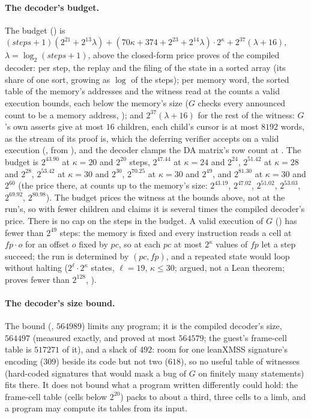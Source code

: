 \documentclass[11pt]{article}
\begin{document}
\paragraph{The decoder's budget.} The budget () is
$(\mathit{steps} + 1)(2^{21} + 2^{13}\lambda) + (70\kappa + 374 + 2^{23} + 2^{14}\lambda)\cdot 2^\kappa + 2^{37}(\lambda + 16)$,
$\lambda = \log_2(\mathit{steps} + 1)$, above the closed-form price  proves of the
compiled decoder: per step, the replay and the filing of the state in a sorted array (its share of
one sort, growing as $\log$ of the steps); per memory word, the sorted table of the memory's
addresses and the witness read at the counts a valid execution bounds, each below the memory's
size ($G$ checks every announced count to be a memory address, ); and
$2^{37}(\lambda + 16)$ for the rest of the witness: $G$'s own asserts give at most $16$ children,
each child's cursor is at most $8192$ words, as the stream of its proof is, which the deferring
verifier accepts on a valid execution (, from
), and the decoder clamps the DA matrix's row count at . The
budget is $2^{43.90}$ at $\kappa = 20$ and $2^{20}$ steps, $2^{47.44}$ at $\kappa = 24$ and
$2^{24}$, $2^{51.42}$ at $\kappa = 28$ and $2^{28}$, $2^{53.42}$ at $\kappa = 30$ and $2^{30}$,
$2^{70.25}$ at $\kappa = 30$ and $2^{49}$, and $2^{81.30}$ at $\kappa = 30$ and $2^{60}$ (the price
there, at counts up to the memory's size: $2^{43.19}$, $2^{47.02}$, $2^{51.02}$, $2^{53.03}$,
$2^{69.92}$, $2^{80.98}$). The budget prices the witness at the bounds above, not at the run's, so
with fewer children and claims it is several times the compiled decoder's price. There is no cap on the steps in the budget. A valid execution of $G$ ()
has fewer than $2^{49}$ steps: the memory is fixed and every instruction reads a cell at
$\mathit{fp}\cdot o$ for an offset $o$ fixed by $\mathit{pc}$, so at each $\mathit{pc}$ at most
$2^\kappa$ values of $\mathit{fp}$ let a step succeed; the run is determined by
$(\mathit{pc}, \mathit{fp})$, and a repeated state would loop without halting
($2^\ell\cdot 2^\kappa$ states, $\ell = 19$, $\kappa \le 30$; argued, not a Lean theorem;
 proves fewer than $2^{128}$, ).

\paragraph{The decoder's size bound.} The bound (, $564989$) limits any program; it is the compiled decoder's size, $564497$ (measured exactly, and proved at most $564579$; the guest's frame-cell table is $517271$ of it), and a slack of $492$: room for one leanXMSS signature's encoding ($309$) beside its code but not two ($618$), so no useful table of witnesses (hard-coded signatures that would mask a bug of $G$ on finitely many statements) fits there. It does not bound what a program written differently could hold: the frame-cell table (cells below $2^{20}$) packs to about a third, three cells to a limb, and a program may compute its tables from its input.
\end{document}
